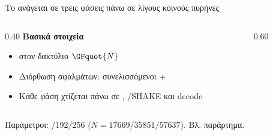 \begin{frame}{Το \HQC ανάγεται σε τρεις φάσεις πάνω σε λίγους κοινούς πυρήνες}
  \begin{center}\small
  \end{center}
  \vspace{0.2em}
  \begin{columns}[T,onlytextwidth]
    \begin{column}{0.40\textwidth}
      \textbf{Βασικά στοιχεία}
      \begin{itemize}
        \item {} \KEM στον δακτύλιο $\GFquot{N}$
        \item Διόρθωση σφαλμάτων: συνελισσόμενοι  + 
        \item Κάθε φάση χτίζεται πάνω σε , /SHAKE και decode
      \end{itemize}
    \end{column}
    \begin{column}{0.60\textwidth}
      \resizebox{\linewidth}{!}{}
    \end{column}
  \end{columns}
  \vspace{0.2em}
  {\footnotesize Παράμετροι: /192/256 ($N=\num{17669}/\num{35851}/\num{57637}$). Βλ. παράρτημα.}
\end{frame}
